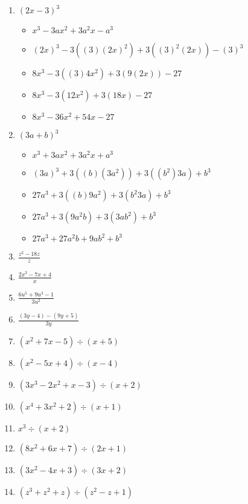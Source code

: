 \documentclass{article}
\begin{document}
\begin{onehalfspace}
\begin{enumerate}
    \item $(2x - 3)^{3}$
    \begin{itemize}
        \item $x^{3} - 3ax^{2} + 3a^{2}x - a^{3}$
        \item $(2x)^{3} - 3((3)(2x)^{2}) + 3((3)^{2}(2x)) - (3)^{3}$
        \item $8x^{3} - 3((3)4x^{2}) + 3(9(2x)) - 27$
        \item $8x^{3} - 3(12x^{2}) + 3(18x) - 27$
        \item $8x^{3} - 36x^{2} + 54x - 27$
    \end{itemize}
    
    \item $(3a + b)^{3}$
    \begin{itemize}
        \item $x^{3} + 3ax^{2} + 3a^{2}x + a^{3}$
        \item $(3a)^{3} + 3((b)(3a^{2})) + 3((b^{2})3a) + b^{3}$
        \item $27a^{3} + 3((b)9a^{2}) + 3(b^{2}3a) + b^{3}$
        \item $27a^{3} + 3(9a^{2}b) + 3(3ab^{2}) + b^{3}$
        \item $27a^{3} + 27a^{2}b + 9ab^{2} + b^{3}$
    \end{itemize}
    
    \item $\frac{z^{2} - 18z}{z}$
    \item $\frac{2x^{3} - 7x + 4}{x}$
    \item $\frac{6u^{5} + 9u^{3} - 1}{3u^{2}}$
    \item $\frac{(3y - 4) - (9y + 5)}{3y}$
    \item $(x^{2} + 7x - 5) \div (x + 5)$
    \item $(x^{2} - 5x + 4) \div (x - 4)$
    \item $(3x^{3} - 2x^{2} + x - 3) \div (x + 2)$
    \item $(x^{4} + 3x^{2} + 2) \div (x + 1)$
    \item $x^{3} \div (x + 2)$
    \item $(8x^{2} + 6x + 7) \div (2x + 1)$
    \item $(3x^{2} - 4x + 3) \div (3x + 2)$
    \item $(z^{3}+ z^{2} + z) \div (z^{2} - z + 1)$
\end{enumerate}
\end{onehalfspace}
\end{document}
